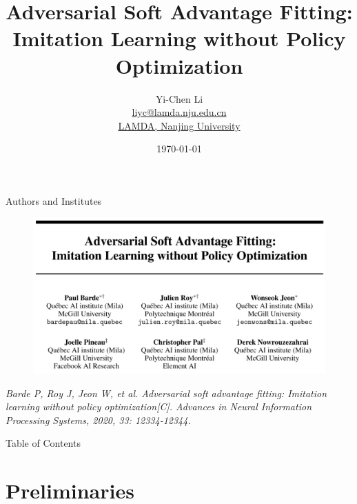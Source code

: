 \documentclass[10pt,aspectratio=169]{beamer}
\title{Adversarial Soft Advantage Fitting: \\ Imitation Learning without Policy Optimization}
\author[Yi-Chen Li]{
    Yi-Chen Li
    \texorpdfstring{\\ \href{mailto:liyc@lamda.nju.edu.cn}{liyc@lamda.nju.edu.cn}}{}
    \texorpdfstring{\\ \href{http://www.lamda.nju.edu.cn/MainPage.ashx}{LAMDA, Nanjing University}}{}
}
\date{\today}
\begin{document}
\frame{\titlepage}



\mybeamerNoHeadline

\begin{frame}{Authors and Institutes}
    \begin{figure}
        \centering
        \includegraphics[width=0.6\linewidth]{paper_fig/info.png}
    \end{figure}
    \textit{Barde P, Roy J, Jeon W, et al. Adversarial soft advantage fitting: Imitation learning without policy optimization[C]. Advances in Neural Information Processing Systems, 2020, 33: 12334-12344.}
\end{frame}

\begin{frame}{Table of Contents}
    \tableofcontents
\end{frame}

\section{Preliminaries}
\end{document}
